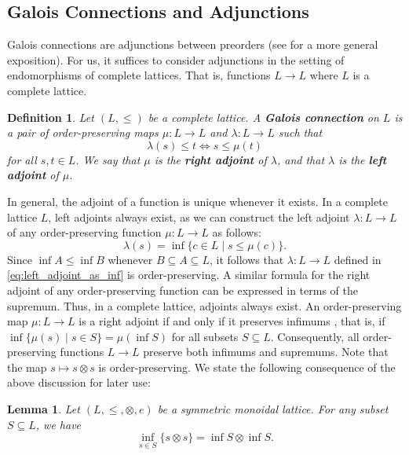 \documentclass[a4paper,11pt]{article}
\newcommand{\tensor}{\otimes}
\newcounter{dummy}\numberwithin{dummy}{section}
\newtheorem{lemma}[dummy]{Lemma}
\newtheorem{definition}[dummy]{Definition}
\theoremstyle{remark}
\begin{document}
\subsection{Galois Connections and Adjunctions}\label{sec:galois_connections_and_adjunctions}
Galois connections are adjunctions between preorders (see \cite[Sec.\ 1.4]{fong2018seven} for a more general exposition). For us, it suffices to consider adjunctions in the setting of endomorphisms of complete lattices. That is, functions $L\to L$ where $L$ is a complete lattice.

\begin{definition}
Let $(L,\leq)$ be a complete lattice. A \textbf{Galois connection} on $L$ is a pair of order-preserving maps $\mu\colon L\to L$ and $\lambda\colon L\to L$ such that
\begin{equation*}
    \lambda(s)\leq t\iff s\leq\mu(t)
\end{equation*}
for all $s,t\in L$. We say that $\mu$ is the \textbf{right adjoint} of $\lambda$, and that $\lambda$ is the \textbf{left adjoint} of $\mu$.
\end{definition}

In general, the adjoint of a function is unique whenever it exists. In a complete lattice $L$, left adjoints always exist, as we can construct the left adjoint $\lambda\colon L\to L$ of any order-preserving function $\mu\colon L\to L$ as follows:
\begin{equation}\label{eq:left_adjoint_as_inf}
    \lambda(s)=\inf\{c\in L\mid s\leq\mu(c)\}.
\end{equation}
Since $\inf A\leq\inf B$ whenever $B\subseteq A\subseteq L$, it follows that $\lambda\colon L\to L$ defined in \cref{eq:left_adjoint_as_inf} is order-preserving. A similar formula for the right adjoint of any order-preserving function can be expressed in terms of the supremum. Thus, in a complete lattice, adjoints always exist. An order-preserving map $\mu\colon L\to L$ is a right adjoint if and only if it preserves infimums \cite[Thm.~1.115]{fong2018seven}, that is, if $\inf\{\mu(s)\mid s\in S\}=\mu(\inf S)$ for all subsets $S\subseteq L$. Consequently, all order-preserving functions $L\to L$ preserve both infimums and supremums. Note that the map $s\mapsto s\tensor s$ is order-preserving. We state the following consequence of the above discussion for later use:
\begin{lemma}\label{lem:inf_product_compatible}
Let $(L,\leq,\tensor,e)$ be a symmetric monoidal lattice. For any subset $S\subseteq L$, we have
\begin{equation*}
    \inf_{s\in S}\{s\tensor s\}=\inf S\tensor \inf S.
\end{equation*}
\end{lemma}
\end{document}
